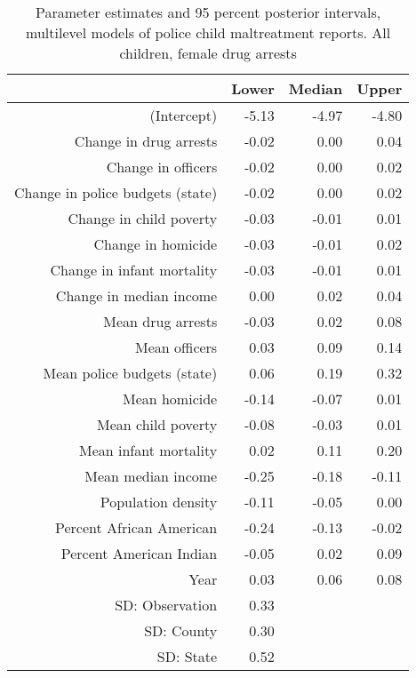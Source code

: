 \begin{table}[ht]
\centering
\begin{tabular}{rrrr}
  \hline
 & Lower & Median & Upper \\ 
  \hline
(Intercept) & -5.13 & -4.97 & -4.80 \\ 
  Change in drug arrests & -0.02 & 0.00 & 0.04 \\ 
  Change in officers & -0.02 & 0.00 & 0.02 \\ 
  Change in police budgets (state) & -0.02 & 0.00 & 0.02 \\ 
  Change in child poverty & -0.03 & -0.01 & 0.01 \\ 
  Change in homicide & -0.03 & -0.01 & 0.02 \\ 
  Change in infant mortality & -0.03 & -0.01 & 0.01 \\ 
  Change in median income & 0.00 & 0.02 & 0.04 \\ 
  Mean drug arrests & -0.03 & 0.02 & 0.08 \\ 
  Mean officers & 0.03 & 0.09 & 0.14 \\ 
  Mean police budgets (state) & 0.06 & 0.19 & 0.32 \\ 
  Mean homicide & -0.14 & -0.07 & 0.01 \\ 
  Mean child poverty & -0.08 & -0.03 & 0.01 \\ 
  Mean infant mortality & 0.02 & 0.11 & 0.20 \\ 
  Mean median income & -0.25 & -0.18 & -0.11 \\ 
  Population density & -0.11 & -0.05 & 0.00 \\ 
  Percent African American & -0.24 & -0.13 & -0.02 \\ 
  Percent American Indian & -0.05 & 0.02 & 0.09 \\ 
  Year & 0.03 & 0.06 & 0.08 \\ 
  SD: Observation & 0.33 &  &  \\ 
  SD: County & 0.30 &  &  \\ 
  SD: State & 0.52 &  &  \\ 
   \hline
\end{tabular}
\caption{Parameter estimates and 95 percent posterior intervals, multilevel models of 
             police child maltreatment reports. All children, female drug arrests} 
\end{table}
